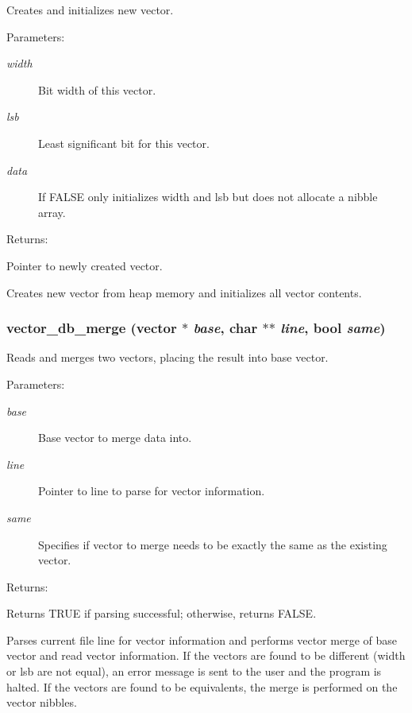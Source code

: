 Creates and initializes new vector.

\begin{Desc}
\item[Parameters: ]\par
\begin{description}
\item[{\em 
width}]Bit width of this vector. \item[{\em 
lsb}]Least significant bit for this vector. \item[{\em 
data}]If FALSE only initializes width and lsb but does not allocate a nibble array.\end{description}
\end{Desc}
\begin{Desc}
\item[Returns: ]\par
Pointer to newly created vector.\end{Desc}
Creates new vector from heap memory and initializes all vector contents. 
\subsubsection{ vector\_\-db\_\-merge ({\bf vector} $\ast$ {\em base}, char $\ast$$\ast$ {\em line}, {\bf bool} {\em same})}\label{vector_8c_a13}


Reads and merges two vectors, placing the result into base vector.

\begin{Desc}
\item[Parameters: ]\par
\begin{description}
\item[{\em 
base}]Base vector to merge data into. \item[{\em 
line}]Pointer to line to parse for vector information. \item[{\em 
same}]Specifies if vector to merge needs to be exactly the same as the existing vector.\end{description}
\end{Desc}
\begin{Desc}
\item[Returns: ]\par
Returns TRUE if parsing successful; otherwise, returns FALSE.\end{Desc}
Parses current file line for vector information and performs vector merge of  base vector and read vector information. If the vectors are found to be different (width or lsb are not equal), an error message is sent to the user and the program is halted. If the vectors are found to be equivalents, the merge is performed on the vector nibbles. 
